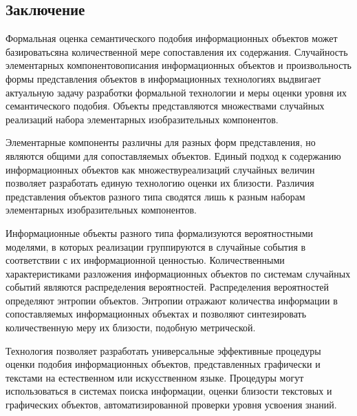 \begin{multicols}{2}
\section{Заключение }

  Формальная оценка семантического подобия информационных объектов
может базироваться\linebreak на количественной мере сопоставления их содержания.
Случайность элементарных компонентов\linebreak описания информационных объектов
и произвольность формы представления объектов в информационных
технологиях выдвигает актуальную задачу разработки формальной технологии
и меры оценки уровня их семантического подобия. Объекты представляются
множествами случайных реализаций набора элементарных изобразительных
компонентов.

  Элементарные компоненты различны для разных форм представления, но
являются общими для сопоставляемых объектов. Единый подход к содержанию
информационных объектов как множеству\linebreak реализаций случайных величин
позволяет разра\-ботать единую технологию оценки их бли\-зости. Различия
представления объектов разного типа сводятся лишь к разным наборам
элементарных изобразительных компонентов.

  Информационные объекты разного типа формализуются вероятностными
моделями, в которых реализации группируются в случайные события в
соответствии с их информационной ценностью. Количественными
характеристиками разложения информационных объектов по системам
случайных событий являются распределения вероятностей. Распределения
вероятностей определяют энтропии объектов. Энтропии отражают количества
информации в сопоставляемых информационных объектах и позволяют
синтезировать количественную меру их близости, подобную метрической.

  Технология позволяет разработать универсальные эффективные процедуры
оценки подобия информа\-ционных объектов, представленных графически и
текстами на естественном или искусственном языке. Процедуры могут
использоваться в сис\-те\-мах поиска информации, оценки близости текстовых и
графических объектов, автоматизированной проверки уровня усвоения знаний.


\end{multicols}
